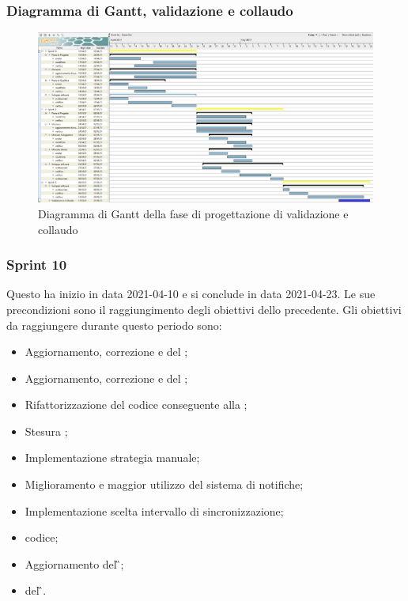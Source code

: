 \subsubsection{Diagramma di Gantt, validazione e collaudo}
\begin{figure}[H]
    \centering
    \includegraphics[scale = 0.33]{components/img/validazione_collaudo.png}
    \caption{Diagramma di Gantt della fase di progettazione di validazione e collaudo}
    \label{fig:Diagramma di Gantt, fase di validazione e collaudo}
\end{figure}
\subsubsection{Sprint 10}
Questo  ha inizio in data 2021-04-10 e si conclude in data 2021-04-23. Le sue precondizioni sono il raggiungimento degli obiettivi dello  precedente.\newline{}
Gli obiettivi da raggiungere durante questo periodo sono:
\begin{itemize}
	\item Aggiornamento, correzione e  del \PdP{};
	\item Aggiornamento, correzione e  del \PdQ{};
	\item Rifattorizzazione del codice conseguente alla \PB{};
	\item Stesura ;
	\item Implementazione strategia manuale;
	\item Miglioramento e maggior utilizzo del sistema di notifiche;
	\item Implementazione scelta intervallo di sincronizzazione;
	\item {} codice;
	\item Aggiornamento del \G{};
	\item {} del \G{}.
\end{itemize}
